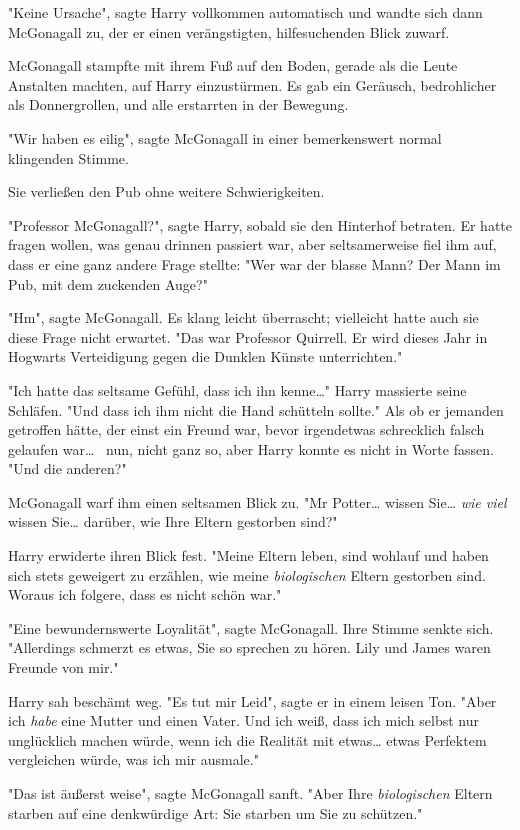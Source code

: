 {"Keine Ursache", sagte Harry vollkommen automatisch und wandte sich dann McGonagall zu, der er einen verängstigten, hilfesuchenden Blick zuwarf.

McGonagall stampfte mit ihrem Fuß auf den Boden, gerade als die Leute Anstalten machten, auf Harry einzustürmen. Es gab ein Geräusch, bedrohlicher als Donnergrollen, und alle erstarrten in der Bewegung.

"Wir haben es eilig", sagte McGonagall in einer bemerkenswert normal klingenden Stimme.

Sie verließen den Pub ohne weitere Schwierigkeiten.

"Professor McGonagall?", sagte Harry, sobald sie den Hinterhof betraten. Er hatte fragen wollen, was genau drinnen passiert war, aber seltsamerweise fiel ihm auf, dass er eine ganz andere Frage stellte: "Wer war der blasse Mann? Der Mann im Pub, mit dem zuckenden Auge?"

"Hm", sagte McGonagall. Es klang leicht überrascht; vielleicht hatte auch sie diese Frage nicht erwartet. "Das war Professor Quirrell. Er wird dieses Jahr in Hogwarts Verteidigung gegen die Dunklen Künste unterrichten."

"Ich hatte das seltsame Gefühl, dass ich ihn kenne…" Harry massierte seine Schläfen. "Und dass ich ihm nicht die Hand schütteln sollte." Als ob er jemanden getroffen hätte, der einst ein Freund war, bevor irgendetwas schrecklich falsch gelaufen war… ~nun, nicht ganz so, aber Harry konnte es nicht in Worte fassen. "Und die anderen?"

McGonagall warf ihm einen seltsamen Blick zu. "Mr Potter… wissen Sie… \emph{wie viel} wissen Sie… darüber, wie Ihre Eltern gestorben sind?"

Harry erwiderte ihren Blick fest. "Meine Eltern leben, sind wohlauf und haben sich stets geweigert zu erzählen, wie meine \emph{biologischen} Eltern gestorben sind. Woraus ich folgere, dass es nicht schön war."

"Eine bewundernswerte Loyalität", sagte McGonagall. Ihre Stimme senkte sich. "Allerdings schmerzt es etwas, Sie so sprechen zu hören. Lily und James waren Freunde von mir."

Harry sah beschämt weg. "Es tut mir Leid", sagte er in einem leisen Ton. "Aber ich \emph{habe} eine Mutter und einen Vater. Und ich weiß, dass ich mich selbst nur unglücklich machen würde, wenn ich die Realität mit etwas… etwas Perfektem vergleichen würde, was ich mir ausmale."

"Das ist äußerst weise", sagte McGonagall sanft. "Aber Ihre \emph{biologischen} Eltern starben auf eine denkwürdige Art: Sie starben um Sie zu schützen."

}
